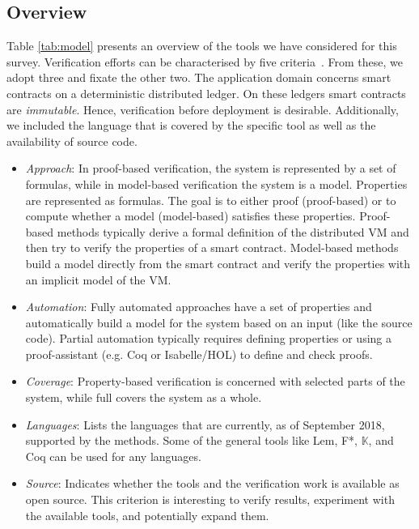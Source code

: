 \subsection{Overview}

Table \ref{tab:model} presents an overview of the tools we have considered for this survey.
Verification efforts can be characterised by five criteria~\cite[173]{Huth2004}. From these, we adopt three and fixate the other two. 
The application domain concerns smart contracts on a deterministic distributed ledger.
On these ledgers smart contracts are \emph{immutable}. Hence, verification before deployment is desirable. 
Additionally, we included the language that is covered by the specific tool as well as the availability of source code.

\begin{itemize}
\item \emph{Approach}: In proof-based verification, the system is represented by a set of formulas, while in model-based verification the system is a model. Properties are represented as formulas. The goal is to either proof (proof-based) or to compute whether a model (model-based) satisfies these properties. Proof-based methods typically derive a formal definition of the distributed VM and then try to verify the properties of a smart contract. Model-based methods build a model directly from the smart contract and verify the properties with an implicit model of the VM.
\item \emph{Automation}: Fully automated approaches have a set of properties and automatically build a model for the system based on an input (like the source code). Partial automation typically requires defining properties or using a proof-assistant (e.g. Coq or Isabelle/HOL) to define and check proofs.
\item \emph{Coverage}: Property-based verification is concerned with selected parts of the system, while full covers the system as a whole.
\item \emph{Languages}: Lists the languages that are currently, as of September 2018, supported by the methods. Some of the general tools like Lem, F*, $\mathbb{K}$, and Coq can be used for any languages.
\item \emph{Source}: Indicates whether the tools and the verification work is available as open source. This criterion is interesting to verify results, experiment with the available tools, and potentially expand them.
\end{itemize}


